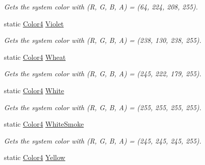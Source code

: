 \begin{DoxyCompactItemize}
\begin{DoxyCompactList}\small\item\em Gets the system color with (R, G, B, A) = (64, 224, 208, 255). \end{DoxyCompactList}\item 
static \hyperlink{struct_open_t_k_1_1_graphics_1_1_color4}{Color4} \hyperlink{struct_open_t_k_1_1_graphics_1_1_color4_a1fc602d69809ebd703b7ec19d6f580f1}{Violet}
\begin{DoxyCompactList}\small\item\em Gets the system color with (R, G, B, A) = (238, 130, 238, 255). \end{DoxyCompactList}\item 
static \hyperlink{struct_open_t_k_1_1_graphics_1_1_color4}{Color4} \hyperlink{struct_open_t_k_1_1_graphics_1_1_color4_a756b4cfcc381987c83f12fc5e937e7d2}{Wheat}
\begin{DoxyCompactList}\small\item\em Gets the system color with (R, G, B, A) = (245, 222, 179, 255). \end{DoxyCompactList}\item 
static \hyperlink{struct_open_t_k_1_1_graphics_1_1_color4}{Color4} \hyperlink{struct_open_t_k_1_1_graphics_1_1_color4_a3a5f6333012a2b9aeef979515b512a83}{White}
\begin{DoxyCompactList}\small\item\em Gets the system color with (R, G, B, A) = (255, 255, 255, 255). \end{DoxyCompactList}\item 
static \hyperlink{struct_open_t_k_1_1_graphics_1_1_color4}{Color4} \hyperlink{struct_open_t_k_1_1_graphics_1_1_color4_a4bff083cb6b57cab59b9810a1b208aca}{White\-Smoke}
\begin{DoxyCompactList}\small\item\em Gets the system color with (R, G, B, A) = (245, 245, 245, 255). \end{DoxyCompactList}\item 
static \hyperlink{struct_open_t_k_1_1_graphics_1_1_color4}{Color4} \hyperlink{struct_open_t_k_1_1_graphics_1_1_color4_a6e91164b460de05342c71c1fa5a2249e}{Yellow}

\end{DoxyCompactItemize}
